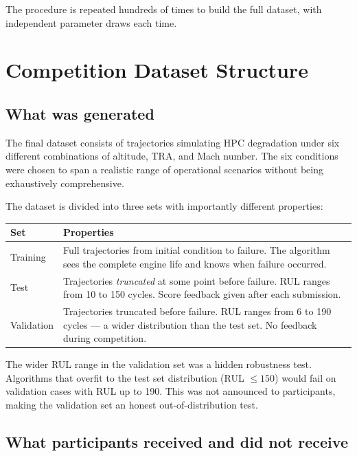 \documentclass[11pt, a4paper]{article}
\begin{document}
The procedure is repeated hundreds of times to build the full dataset,
with independent parameter draws each time.

\section{Competition Dataset Structure}

\subsection{What was generated}

The final dataset consists of trajectories simulating HPC degradation
under six different combinations of altitude, TRA, and Mach number.
The six conditions were chosen to span a realistic range of operational
scenarios without being exhaustively comprehensive.

The dataset is divided into three sets with importantly different
properties:

\begin{center}
\begin{tabular}{@{}lp{9.5cm}@{}}
  \toprule
  Set & Properties \\
  \midrule
  Training   & Full trajectories from initial condition to failure.
               The algorithm sees the complete engine life and knows
               when failure occurred. \\
  Test       & Trajectories \emph{truncated} at some point before
               failure. RUL ranges from 10 to 150 cycles.
               Score feedback given after each submission. \\
  Validation & Trajectories truncated before failure. RUL ranges from
               6 to 190 cycles --- a wider distribution than the test
               set. No feedback during competition. \\
  \bottomrule
\end{tabular}
\end{center}

The wider RUL range in the validation set was a hidden robustness test.
Algorithms that overfit to the test set distribution (RUL $\leq 150$)
would fail on validation cases with RUL up to 190. This was not
announced to participants, making the validation set an honest
out-of-distribution test.

\subsection{What participants received and did not receive}
\end{document}
